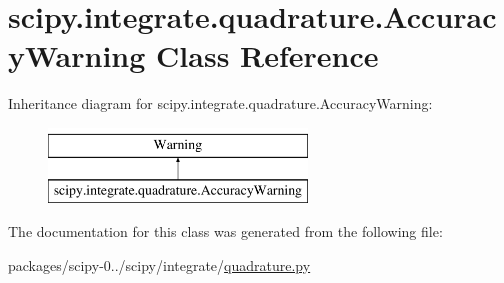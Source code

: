 \hypertarget{classscipy_1_1integrate_1_1quadrature_1_1AccuracyWarning}{}\section{scipy.\+integrate.\+quadrature.\+Accuracy\+Warning Class Reference}
\label{classscipy_1_1integrate_1_1quadrature_1_1AccuracyWarning}
Inheritance diagram for scipy.\+integrate.\+quadrature.\+Accuracy\+Warning\+:\begin{figure}[H]
\begin{center}
\leavevmode
\includegraphics[height=2.000000cm]{classscipy_1_1integrate_1_1quadrature_1_1AccuracyWarning}
\end{center}
\end{figure}


The documentation for this class was generated from the following file\+:\begin{DoxyCompactItemize}
\item 
packages/scipy-\/0../scipy/integrate/\hyperlink{quadrature_8py}{quadrature.\+py}\end{DoxyCompactItemize}
